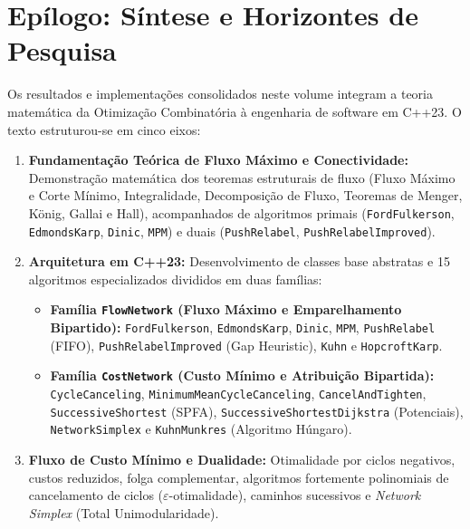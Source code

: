 \chapter*{Epílogo: Síntese e Horizontes de Pesquisa}\label{sec:conclusoes}

Os resultados e implementações consolidados neste volume integram a teoria matemática da Otimização Combinatória à engenharia de software em C++23. O texto estruturou-se em cinco eixos:

\begin{enumerate}[leftmargin=1.5em, itemsep=0.4em]
    \item \textbf{Fundamentação Teórica de Fluxo Máximo e Conectividade:} Demonstração matemática dos teoremas estruturais de fluxo (Fluxo Máximo e Corte Mínimo, Integralidade, Decomposição de Fluxo, Teoremas de Menger, König, Gallai e Hall), acompanhados de algoritmos primais (\lstinline{FordFulkerson}, \lstinline{EdmondsKarp}, \lstinline{Dinic}, \lstinline{MPM}) e duais (\lstinline{PushRelabel}, \lstinline{PushRelabelImproved}).

    \item \textbf{Arquitetura em C++23:} Desenvolvimento de classes base abstratas e 15 algoritmos especializados divididos em duas famílias:
    \begin{itemize}
        \item \textbf{Família \lstinline{FlowNetwork} (Fluxo Máximo e Emparelhamento Bipartido):} \lstinline{FordFulkerson}, \lstinline{EdmondsKarp}, \lstinline{Dinic}, \lstinline{MPM}, \lstinline{PushRelabel} (FIFO), \lstinline{PushRelabelImproved} (Gap Heuristic), \lstinline{Kuhn} e \lstinline{HopcroftKarp}.
        \item \textbf{Família \lstinline{CostNetwork} (Custo Mínimo e Atribuição Bipartida):} \lstinline{CycleCanceling}, \lstinline{MinimumMeanCycleCanceling}, \lstinline{CancelAndTighten}, \lstinline{SuccessiveShortest} (SPFA), \lstinline{SuccessiveShortestDijkstra} (Potenciais), \lstinline{NetworkSimplex} e \lstinline{KuhnMunkres} (Algoritmo Húngaro).
    \end{itemize}

    \item \textbf{Fluxo de Custo Mínimo e Dualidade:} Otimalidade por ciclos negativos, custos reduzidos, folga complementar, algoritmos fortemente polinomiais de cancelamento de ciclos ($\varepsilon$-otimalidade), caminhos sucessivos e \textit{Network Simplex} (Total Unimodularidade).


\end{enumerate}
